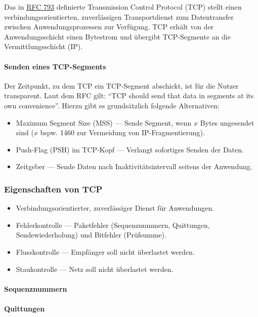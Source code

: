 \documentclass[a4paper, 14pt]{article}
\begin{document}
	Das in \href{https://tools.ietf.org/html/rfc793}{RFC 793} definierte Transmission Control Protocol (TCP) stellt einen verbindungsorientierten, zuverlässigen Transportdienst zum Datentransfer zwischen Anwendungsprozessen zur Verfügung.
	TCP erhält von der Anwendungsschicht einen Bytestrom und übergibt TCP-Segmente an die Vermittlungsschicht (IP).

	\paragraph{Senden eines TCP-Segments}
	
	Der Zeitpunkt, zu dem TCP ein TCP-Segment abschickt, ist für die Nutzer transparent.
	Laut dem RFC gilt: \enquote{TCP should send that data in segments at its own convenience}.
	Hierzu gibt es grundsätzlich folgende Alternativen:

	\begin{itemize}
		\item Maximum Segment Size (MSS) --- Sende Segment, wenn $x$ Bytes ungesendet sind ($x$ bspw. \SI{1460}{\byte} zur Vermeidung von IP-Fragmentierung).
		\item Push-Flag (PSH) im TCP-Kopf --- Verlangt sofortiges Senden der Daten.
		\item Zeitgeber --- Sende Daten nach Inaktivitätsintervall seitens der Anwendung.
	\end{itemize}

	\subsubsection{Eigenschaften von TCP}

	\begin{itemize}
		\item Verbindungsorientierter, zuverlässiger Dienst für Anwendungen.
		\item Fehlerkontrolle --- Paketfehler (Sequenznummern, Quittungen, Sendewiederholung) und Bitfehler (Prüfsumme).
		\item Flusskontrolle --- Empfänger soll nicht überlastet werden.
		\item Staukontrolle --- Netz soll nicht überlastet werden.
	\end{itemize}

	\paragraph{Sequenznummern}

	\paragraph{Quittungen}
	
\end{document}
